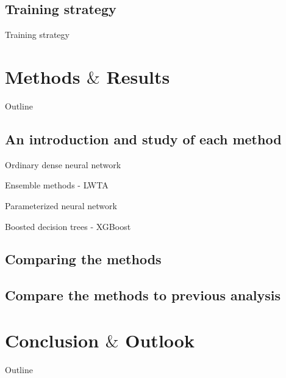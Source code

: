 \documentclass[UKenglish]{beamer}
\begin{document}
\subsection{Training strategy}
\begin{frame}{Training strategy}
 
\end{frame}


\section{Methods $\&$ Results}
\begin{frame}{Outline}
    \tableofcontents[currentsection]
\end{frame}

\subsection*{An introduction and study of each method}


\begin{frame}{Ordinary dense neural network}
    
\end{frame}
\begin{frame}{Ensemble methods - LWTA}
    
\end{frame}
\begin{frame}{Parameterized neural network}
    
\end{frame}


\begin{frame}{Boosted decision trees - XGBoost}
 
\end{frame}
\subsection{Comparing the methods}

\subsection{Compare the methods to previous analysis}

\section{Conclusion $\&$ Outlook}
\begin{frame}{Outline}
    \tableofcontents[currentsection]
\end{frame}
\end{document}
